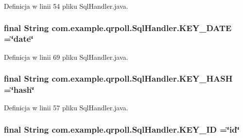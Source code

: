 Definicja w linii 54 pliku Sql\+Handler.\+java.

\hypertarget{classcom_1_1example_1_1qrpoll_1_1_sql_handler_a93e50d5f5a35250e6655f1d8f3192975}{
\subsubsection[{K\+E\+Y\+\_\+\+D\+A\+T\+E}]{\setlength{\rightskip}{0pt plus 5cm}final String com.\+example.\+qrpoll.\+Sql\+Handler.\+K\+E\+Y\+\_\+\+D\+A\+T\+E =\char`\"{}date\char`\"{}\hspace{0.3cm}{\ttfamily [static]}}}\label{classcom_1_1example_1_1qrpoll_1_1_sql_handler_a93e50d5f5a35250e6655f1d8f3192975}


Definicja w linii 69 pliku Sql\+Handler.\+java.

\hypertarget{classcom_1_1example_1_1qrpoll_1_1_sql_handler_a300c5ab4aec2e6338f2ca3477c86821b}{
\subsubsection[{K\+E\+Y\+\_\+\+H\+A\+S\+H}]{\setlength{\rightskip}{0pt plus 5cm}final String com.\+example.\+qrpoll.\+Sql\+Handler.\+K\+E\+Y\+\_\+\+H\+A\+S\+H =\char`\"{}hash\char`\"{}\hspace{0.3cm}{\ttfamily [static]}}}\label{classcom_1_1example_1_1qrpoll_1_1_sql_handler_a300c5ab4aec2e6338f2ca3477c86821b}


Definicja w linii 57 pliku Sql\+Handler.\+java.

\hypertarget{classcom_1_1example_1_1qrpoll_1_1_sql_handler_ac68ddd9373f28e201126af152708a978}{
\subsubsection[{K\+E\+Y\+\_\+\+I\+D}]{\setlength{\rightskip}{0pt plus 5cm}final String com.\+example.\+qrpoll.\+Sql\+Handler.\+K\+E\+Y\+\_\+\+I\+D =\char`\"{}id\char`\"{}\hspace{0.3cm}{\ttfamily [static]}}}\label{classcom_1_1example_1_1qrpoll_1_1_sql_handler_ac68ddd9373f28e201126af152708a978}



